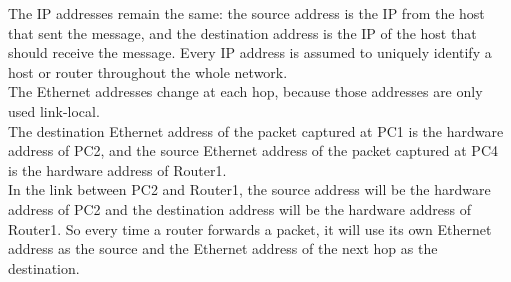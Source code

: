 The IP addresses remain the same: the source address is the IP from the host that sent the message, and the destination address is the IP of the host that should receive the message. Every IP address is assumed to uniquely identify a host or router throughout the whole network. \\

The Ethernet addresses change at each hop, because those addresses are only used link-local. \\The destination Ethernet address of the packet captured at PC1 is the hardware address of PC2, and the source Ethernet address of the packet captured at PC4 is the hardware address of Router1. \\In the link between PC2 and Router1, the source address will be the hardware address of PC2 and the destination address will be the hardware address of Router1. So every time a router forwards a packet, it will use its own Ethernet address as the source and the Ethernet address of the next hop as the destination.